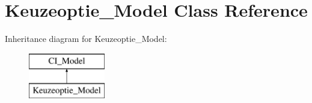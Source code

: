 \hypertarget{class_keuzeoptie___model}{}\section{Keuzeoptie\+\_\+\+Model Class Reference}
\label{class_keuzeoptie___model}
Inheritance diagram for Keuzeoptie\+\_\+\+Model\+:\begin{figure}[H]
\begin{center}
\leavevmode
\includegraphics[height=2.000000cm]{class_keuzeoptie___model}
\end{center}
\end{figure}
